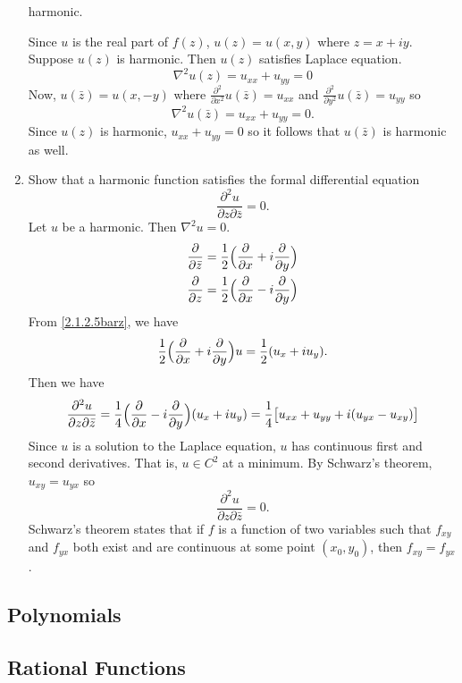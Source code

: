 \begin{enumerate}
  harmonic.
  \par\smallskip
  Since \(u\) is the real part of \(f(z)\), \(u(z) = u(x,y)\) where
  \(z = x + iy\).
  Suppose \(u(z)\) is harmonic.
  Then \(u(z)\) satisfies Laplace equation.
  \[
  \nabla^2u(z) = u_{xx} + u_{yy} = 0
  \]
  Now, \(u(\bar{z}) = u(x,-y)\) where
  \(\frac{\partial^2}{\partial x^2}u(\bar{z}) = u_{xx}\) and
  \(\frac{\partial^2}{\partial y^2}u(\bar{z}) = u_{yy}\) so
  \[
  \nabla^2u(\bar{z}) = u_{xx} + u_{yy} = 0.
  \]
  Since \(u(z)\) is harmonic, \(u_{xx} + u_{yy} = 0\) so it follows that
  \(u(\bar{z})\) is harmonic as well.
\item
  Show that a harmonic function satisfies the formal differential equation
  \[
  \frac{\partial^2u}{\partial z\partial\bar{z}} = 0.
  \]
  Let \(u\) be a harmonic.
  Then \(\nabla^2u = 0\).
  \begin{subequations}
    \begin{align}
      \frac{\partial}{\partial\bar{z}}
      & = \frac{1}{2}\Bigl(\frac{\partial}{\partial x} +
        i\frac{\partial}{\partial y}\Bigr)\label{2.1.2.5barz}\\
      \frac{\partial}{\partial z}
      & = \frac{1}{2}\Bigl(\frac{\partial}{\partial x} -
        i\frac{\partial}{\partial y}\Bigr)\label{2.1.2.5z}
    \end{align}
  \end{subequations}
  From \cref{2.1.2.5barz}, we have
  \[
  \frac{1}{2}\Bigl(\frac{\partial}{\partial x} +
  i\frac{\partial}{\partial y}\Bigr)u = \frac{1}{2}(u_x + iu_y).
  \]
  Then we have
  \[
  \frac{\partial^2u}{\partial z\partial\bar{z}} =
  \frac{1}{4}\Bigl(\frac{\partial}{\partial x} -
  i\frac{\partial}{\partial y}\Bigr)(u_x + iu_y) =
  \frac{1}{4}\bigl[u_{xx} + u_{yy} + i(u_{yx} - u_{xy})\bigr]
  \]
  Since \(u\) is a solution to the Laplace equation, \(u\) has continuous first
  and second derivatives.
  That is, \(u\in C^2\) at a minimum.
  By Schwarz's theorem, \(u_{xy} = u_{yx}\) so
  \[
  \frac{\partial^2u}{\partial z\partial\bar{z}} = 0.
  \]
  Schwarz's theorem states that if \(f\) is a function of two variables such
  that \(f_{xy}\) and \(f_{yx}\) both exist and are continuous at some point
  \((x_0,y_0)\), then \(f_{xy} = f_{yx}\).
\end{enumerate}

\subsection{Polynomials}

\subsection{Rational Functions}

